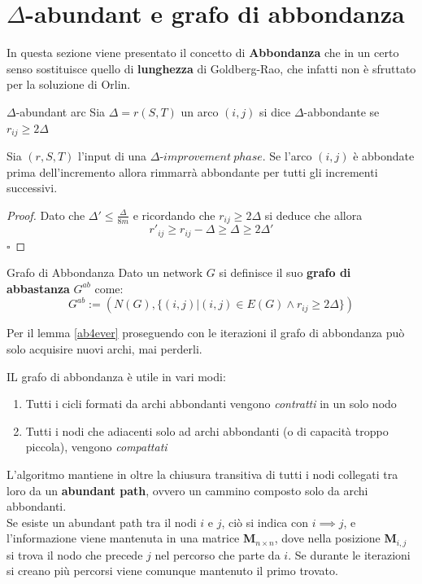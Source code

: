 \documentclass[a4paper, 11pt]{report}
\newcommand*{\QED}{\null\nobreak\hfill\ensuremath{\square}}%
\begin{document}
\section{$\Delta$-abundant e grafo di abbondanza}
In questa sezione viene presentato il concetto di \textbf{Abbondanza} che in un certo senso sostituisce quello di \textbf{lunghezza} di Goldberg-Rao, che infatti non è sfruttato per la soluzione di Orlin.
\begin{definition}{$\Delta$-abundant arc}{}
    Sia $\Delta = r(S,T)$ un arco $(i,j)$ si dice $\Delta$-abbondante se $r_{ij} \ge 2\Delta$ 
     
\end{definition}
\begin{lemma}[label = ab4ever]{}{}
    
    Sia $(r,S,T)$ l'input di una $\Delta\text{-}improvement\ phase$. Se l'arco $(i,j)$ è abbondate prima dell'incremento allora rimmarrà abbondante per tutti gli incrementi successivi.
\end{lemma}
\begin{proof}
    Dato che 
    $\Delta' \le \frac{\Delta}{8m} $ e ricordando che $r_{ij} \ge 2\Delta $ si deduce che 
    allora \[r'_{ij} \ge r_{ij}-\Delta \ge\Delta\ge  2\Delta'\]\QED
\end{proof}

\begin{definition}{Grafo di Abbondanza}{}
    Dato un network $G$ si definisce il suo \textbf{grafo di abbastanza} $G^{ab}$ come: 
    \[G^{ab} := (N(G), \{(i,j)| (i,j)\in E(G)\land r_{ij}\ge 2\Delta\})\]
\end{definition}
\begin{obs}{}{}
    Per il lemma \ref{ab4ever} proseguendo con le iterazioni il grafo di abbondanza può solo acquisire nuovi archi, mai perderli.
\end{obs}

IL grafo di abbondanza è utile in vari modi: 
\begin{enumerate}
    \item Tutti i cicli formati da archi abbondanti vengono \textit{contratti} in un solo nodo
    \item Tutti i nodi che adiacenti solo ad archi abbondanti (o di capacità troppo piccola), vengono \textit{compattati}
\end{enumerate}
L'algoritmo mantiene in oltre la chiusura transitiva di tutti i nodi collegati tra loro da un \textbf{abundant path}, ovvero un cammino composto solo da archi abbondanti. \\
Se esiste un abundant path tra il nodi $i$ e $j$, ciò si indica con $i\implies j$, e l'informazione viene mantenuta in una matrice \textbf{M}$_{n\times n}$, dove nella posizione 
\textbf{M}$_{i,j}$ si trova il nodo che precede $j$ nel percorso che parte da $i$. Se durante le iterazioni si creano più percorsi viene comunque mantenuto il primo trovato.
\end{document}
